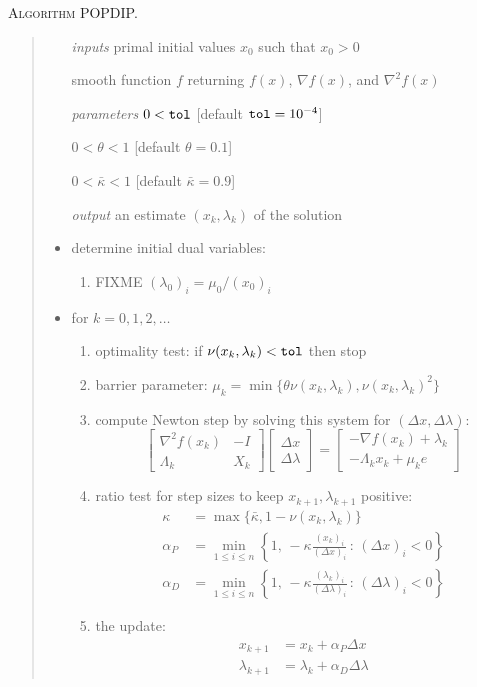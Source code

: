 \documentclass[11pt]{article}
\newcommand{\grad}{\nabla}
\begin{document}
\bigskip
\noindent \textsc{Algorithm POPDIP.}
\begin{quote}
\begin{itemize}
\item[\emph{inputs}]  primal initial values $x_0$ such that $x_0 > 0$
\item[]  smooth function $f$ returning $f(x)$, $\grad f(x)$, and $\grad^2 f(x)$
\item[\emph{parameters}]  $0<\text{\texttt{tol}}$ [default $\text{\texttt{tol}}=10^{-4}$]
\item[]  $0<\theta<1$ [default $\theta=0.1$]
\item[]  $0<\bar\kappa<1$ [default $\bar\kappa=0.9$]
\item[\emph{output}]  an estimate $(x_k,\lambda_k)$ of the solution
\item  determine initial dual variables:
    \renewcommand{\labelenumi}{(\roman{enumi})}
    \begin{enumerate}
    \item FIXME $(\lambda_0)_i = \mu_0 / (x_0)_i$
    \end{enumerate}
\item  for $k=0,1,2,\dots$
    \renewcommand{\labelenumi}{(\roman{enumi})}
    \begin{enumerate}
    \item optimality test: if $\nu(x_k,\lambda_k)<\text{\texttt{tol}}$ then stop
    \item barrier parameter: $\mu_k = \min\{\theta \nu(x_k,\lambda_k),\nu(x_k,\lambda_k)^2\}$
    \item compute Newton step by solving this system for $(\Delta x,\Delta \lambda)$:
    $$\begin{bmatrix}
\grad^2 f(x_k) & - I \\
\Lambda_k & X_k
\end{bmatrix}
\begin{bmatrix}
\Delta x \\
\Delta \lambda
\end{bmatrix}
=
\begin{bmatrix}
-\grad f(x_k) + \lambda_k \\
-\Lambda_k x_k + \mu_k e
\end{bmatrix}$$
    \item ratio test for step sizes to keep $x_{k+1},\lambda_{k+1}$ positive:
\begin{align*}
\kappa &= \max\{\bar\kappa,1-\nu(x_k,\lambda_k)\} \\
\alpha_P &= \min_{1\le i\le n} \left\{1, \,-\kappa \frac{(x_k)_i}{(\Delta x)_i} \,:\, (\Delta x)_i < 0\right\} \\
\alpha_D &= \min_{1\le i\le n} \left\{1, \,-\kappa \frac{(\lambda_k)_i}{(\Delta \lambda)_i} \,:\, (\Delta \lambda)_i < 0\right\}
\end{align*}
    \item the update:
\begin{align*}
x_{k+1} &= x_k + \alpha_P \Delta x \\
\lambda_{k+1} &= \lambda_k + \alpha_D \Delta \lambda
\end{align*}
    \end{enumerate}
\end{itemize}
\end{quote}
\end{document}
